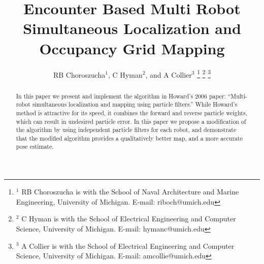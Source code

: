 \documentclass[letterpaper, 10 pt, conference]{ieeeconf}  %
\title{Encounter Based Multi Robot Simultaneous Localization and Occupancy Grid Mapping}
\author{RB Choroszucha$^{1}$, C Hyman$^{2}$, and A Collier$^{3}$ %
\thanks{$^{1}$ RB Choroszucha is with the School of Naval Architecture and Marine Engineering, University of Michigan.  E-mail: riboch{@}umich.edu}%
\thanks{$^{2}$ C Hyman is with the School of Electrical Engineering and Computer Science, University of Michigan. E-mail: {hymanc}{@}umich.edu}
\thanks{$^{3}$ A Collier is with the School of Electrical Engineering and Computer Science, University of Michigan. E-mail: {amcollie}{@}umich.edu}
}
\begin{document}
\maketitle
\thispagestyle{empty}
\pagestyle{empty}


\begin{abstract}

In this paper we present and implement the algorithm in Howard's 2006 paper: ``Multi-robot simultaneous localization and mapping using particle filters.''  While Howard's method is attractive for its speed, it combines the forward and reverse particle weights, which can result in undesired particle error.  In this paper we propose a modification of the algorithm by using independent particle filters for each robot, and demonstrate that the modified algorithm provides a qualitatively better map, and a more accurate pose estimate.


\end{abstract}
















\addtolength{\textheight}{-12cm}   %







\end{document}

